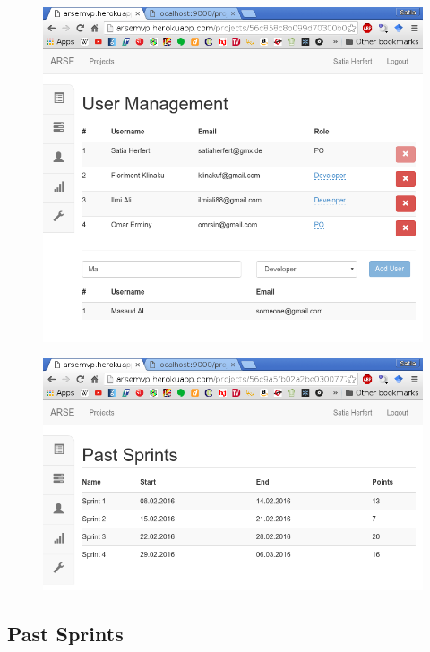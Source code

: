 \documentclass[
	accentcolor=tud1a %
]{tudreport}
\begin{document}
\begin{figure}[ht]
\centering
\begin{minipage}{.5\textwidth}
  \centering
  	\includegraphics[height=15EM]{img/usermgmt}
  	\label{fig:project-user-management}
\end{minipage}%
\begin{minipage}{.5\textwidth}
	\centering
	\includegraphics[height=15EM]{img/pastsprints}
	\label{fig:project-past-sprints}
\end{minipage}
\end{figure}

\subsection{Past Sprints}
\label{sec:past-spints}
\end{document}
